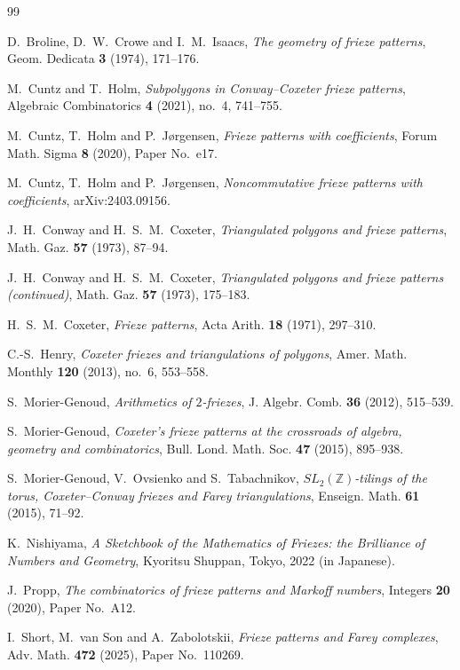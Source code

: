\documentclass[amstex,11pt,reqno]{amsart}
\theoremstyle{definition}
\begin{document}
\begin{thebibliography}{99}

D.~Broline, D.~W.~Crowe and I.~M.~Isaacs,
\emph{The geometry of frieze patterns},
Geom. Dedicata \textbf{3} (1974), 171--176.

M.~Cuntz and T.~Holm,
\emph{Subpolygons in Conway--Coxeter frieze patterns},
Algebraic Combinatorics \textbf{4} (2021), no.~4, 741--755.

M.~Cuntz, T.~Holm and P.~J\o rgensen,
\emph{Frieze patterns with coefficients},
Forum Math. Sigma \textbf{8} (2020), Paper No.~e17.

M.~Cuntz, T.~Holm and P.~J\o rgensen,
\emph{Noncommutative frieze patterns with coefficients},
arXiv:2403.09156.

J.~H.~Conway and H.~S.~M.~Coxeter,
\emph{Triangulated polygons and frieze patterns},
Math. Gaz. \textbf{57} (1973), 87--94.

J.~H.~Conway and H.~S.~M.~Coxeter,
\emph{Triangulated polygons and frieze patterns (continued)},
Math. Gaz. \textbf{57} (1973), 175--183.

H.~S.~M.~Coxeter,
\emph{Frieze patterns},
Acta Arith. \textbf{18} (1971), 297--310.

C.-S.~Henry,
\emph{Coxeter friezes and triangulations of polygons},
Amer. Math. Monthly \textbf{120} (2013), no.~6, 553--558.

S.~Morier-Genoud,
\emph{Arithmetics of $2$-friezes},
J. Algebr. Comb. \textbf{36} (2012), 515--539.

S.~Morier-Genoud,
\emph{Coxeter's frieze patterns at the crossroads of algebra, geometry and combinatorics},
Bull. Lond. Math. Soc. \textbf{47} (2015), 895--938.

S.~Morier-Genoud, V.~Ovsienko and S.~Tabachnikov,
\emph{$SL_2(\mathbb Z)$-tilings of the torus, Coxeter--Conway friezes and Farey triangulations},
Enseign. Math. \textbf{61} (2015), 71--92.

K.~Nishiyama,
\emph{A Sketchbook of the Mathematics of Friezes: the Brilliance of Numbers and Geometry},
Kyoritsu Shuppan, Tokyo, 2022 (in Japanese).

J.~Propp,
\emph{The combinatorics of frieze patterns and Markoff numbers},
Integers \textbf{20} (2020), Paper No.~A12.

I.~Short, M.~van Son and A.~Zabolotskii,
\emph{Frieze patterns and Farey complexes},
Adv. Math. \textbf{472} (2025), Paper No.~110269.

\end{thebibliography}
\end{document}
